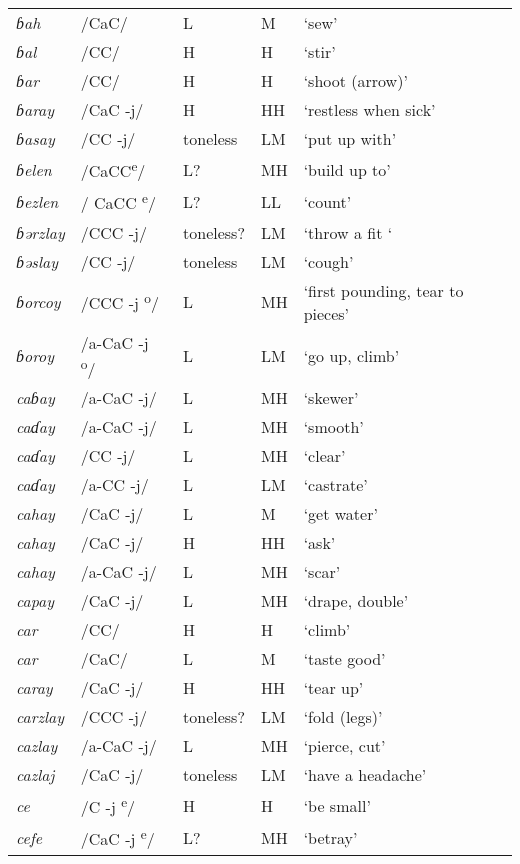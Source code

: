 \begin{small}
\begin{longtable}{lp{1.75cm}p{1.75cm}p{1.75cm}p{3cm}}
\textit{ɓah} & /CaC/ & L & M & ‘sew’\\
\textit{ɓal} & /CC/ & H & H & ‘stir’\\
\textit{ɓar} & /CC/ & H & H & ‘shoot (arrow)’\\
\textit{ɓaray} & /CaC -j/ & H & HH & ‘restless when sick’\\
\textit{ɓasay} & /CC -j/ & toneless & LM & ‘put up with’\\
\textit{ɓelen} & /CaCC\textsuperscript{e}/ & L? & MH & ‘build up to’\\
\textit{ɓezlen} & / CaCC \textsuperscript{e}/ & L? & LL & ‘count’\\
\textit{ɓərzlay} & /CCC -j/ & toneless? & LM & ‘throw a fit ‘\\
\textit{ɓəslay} & /CC -j/ & toneless & LM & ‘cough’\\
\textit{ɓorcoy} & /CCC  {}-j\textsuperscript{ o}/ & L & MH & ‘first pounding, tear to pieces’\\
\textit{ɓoroy} & /a-CaC -j\textsuperscript{ o}/ & L & LM & ‘go up, climb’\\
\textit{caɓay} & /a-CaC -j/ & L & MH & ‘skewer’\\
\textit{caɗay} & /a-CaC -j/ & L & MH & ‘smooth’\\
\textit{caɗay} & /CC -j/ & L & MH & ‘clear’\\
\textit{caɗay} & /a-CC -j/ & L & LM & ‘castrate’\\
\textit{cahay} & /CaC -j/ & L & M & ‘get water’\\
\textit{cahay} & /CaC -j/ & H & HH & ‘ask’\\
\textit{cahay} & /a-CaC -j/ & L & MH & ‘scar’\\
\textit{capay} & /CaC -j/ & L & MH & ‘drape, double’\\
\textit{car} & /CC/ & H & H & ‘climb’\\
\textit{car} & /CaC/ & L & M & ‘taste good’\\
\textit{caray} & /CaC -j/ & H & HH & ‘tear up’\\
\textit{carzlay} & /CCC -j/ & toneless? & LM & ‘fold (legs)’\\
\textit{cazlay} & /a-CaC -j/ & L & MH & ‘pierce, cut’\\
\textit{cazlaj} & /CaC -j/ & toneless & LM & ‘have a headache’\\
\textit{ce} & /C -j \textsuperscript{e}/ & H & H & ‘be small’\\
\textit{cefe} & /CaC -j \textsuperscript{e}/ & L? & MH & ‘betray’\\

\end{longtable}
\end{small}

